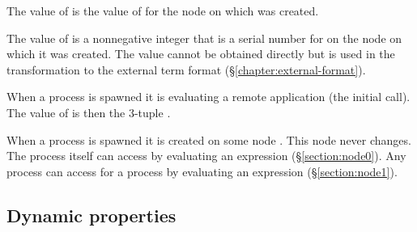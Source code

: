 \begin{Lentry}
\item[\T{creation[\Z{P}]}]
The value of  is the value of  for the
node  on which  was created.

\item[\T{ID[\Z{P}]}]
The value of  is a nonnegative integer that is a serial number for 
on the node on which it was
created.  The value cannot be obtained directly but is used in the transformation
to the external term format (\S\ref{chapter:external-format}).

\item[\T{initial_call[\Z{P}]}]
When a process  is spawned it is evaluating a remote application
 (the initial call).
The value of  is then
the 3-tuple \T{\{\Z{Mod},\Z{Fun},\Z{k}]\}}.

\item[\T{node[\Z{P}]}]
When a process is spawned it is created on some node .
This node never changes. The process  itself can access
 by evaluating an expression  (\S\ref{section:node0}).
Any process can access  for a process  by evaluating an expression
 (\S\ref{section:node1}).
\end{Lentry}

\subsection{Dynamic properties}

\label{section:process-state-dynamic}

